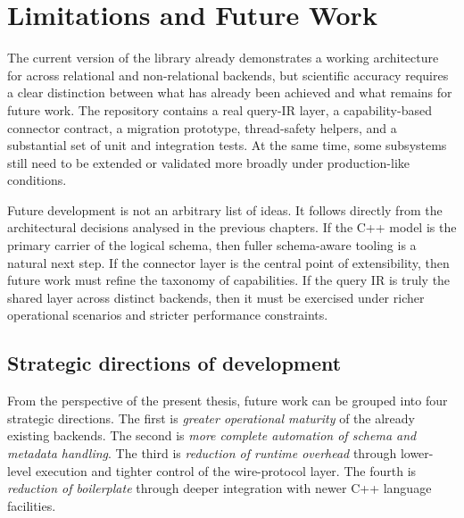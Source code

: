 \section{Limitations and Future Work}
\label{sec:future_work}

The current version of the library already demonstrates a working architecture for \ORMName{} across relational and non-relational backends, but scientific accuracy requires a clear distinction between what has already been achieved and what remains for future work. The repository contains a real query-IR layer, a capability-based connector contract, a migration prototype, thread-safety helpers, and a substantial set of unit and integration tests. At the same time, some subsystems still need to be extended or validated more broadly under production-like conditions.

Future development is not an arbitrary list of ideas. It follows directly from the architectural decisions analysed in the previous chapters. If the C++ model is the primary carrier of the logical schema, then fuller schema-aware tooling is a natural next step. If the connector layer is the central point of extensibility, then future work must refine the taxonomy of capabilities. If the query IR is truly the shared layer across distinct backends, then it must be exercised under richer operational scenarios and stricter performance constraints.

\subsection{Strategic directions of development}

From the perspective of the present thesis, future work can be grouped into four strategic directions. The first is \emph{greater operational maturity} of the already existing backends. The second is \emph{more complete automation of schema and metadata handling}. The third is \emph{reduction of runtime overhead} through lower-level execution and tighter control of the wire-protocol layer. The fourth is \emph{reduction of boilerplate} through deeper integration with newer C++ language facilities.

